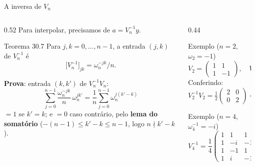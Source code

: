 \documentclass[aspectratio=169,10pt]{beamer}
\newcommand{\w}[2][n]{\omega_{#1}^{#2}}       %
\begin{document}
\begin{frame}{A inversa de $V_n$}
  \begin{columns}[T]
    \begin{column}{0.52\textwidth}
      Para interpolar, precisamos de $a = V_n^{-1} y$.
      \begin{block}{Teorema 30.7}
        Para $j,k = 0,\dots,n-1$, a entrada $(j,k)$ de $V_n^{-1}$ é
        \[
          \big[V_n^{-1}\big]_{jk} = \w{-jk}/n.
        \]
      \end{block}
      \textbf{Prova}: entrada $(k,k')$ de $V_n^{-1}V_n$:
      \[
        \sum_{j=0}^{n-1} \frac{\w{-jk}}{n}\,\w{jk'} = \frac{1}{n}\sum_{j=0}^{n-1}\w{j(k'-k)}
      \]
      $= 1$ se $k'=k$; e $= 0$ caso contrário, pelo \textbf{lema do somatório}
      ($-(n-1) \le k'-k \le n-1$, logo $n \nmid k'-k$).
    \end{column}
    \begin{column}{0.44\textwidth}
      \small
      \begin{exampleblock}{Exemplo ($n=2$, $\omega_2 = -1$)}
        \[
          V_2 = \begin{pmatrix} 1 & 1\\ 1 & -1\end{pmatrix},\quad
          V_2^{-1} = \frac12\begin{pmatrix} 1 & 1\\ 1 & -1\end{pmatrix}
        \]
        Conferindo: $V_2^{-1}V_2 = \frac12\begin{pmatrix} 2 & 0\\ 0 & 2\end{pmatrix} = I$
      \end{exampleblock}
      \begin{exampleblock}{Exemplo ($n=4$, $\w[4]{-1} = -i$)}
        \[
          V_4^{-1} = \frac14\begin{pmatrix}
            1 & 1 & 1 & 1\\
            1 & -i & -1 & i\\
            1 & -1 & 1 & -1\\
            1 & i & -1 & -i
          \end{pmatrix}
        \]
      \end{exampleblock}
    \end{column}
  \end{columns}
\end{frame}
\end{document}
